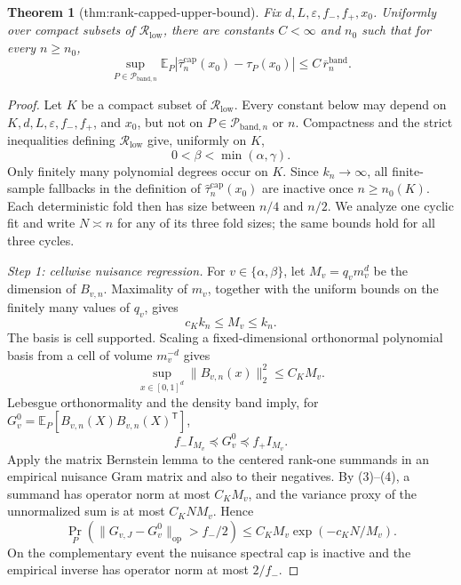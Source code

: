 \documentclass{article}
\newtheorem{theorem}{Theorem}
\begin{document}
\begin{theorem}[thm:rank-capped-upper-bound]\label{thm:rank-capped-upper-bound}
Fix \(d,L,\varepsilon,f_{-},f_{+},x_0\). Uniformly over compact subsets of \(\mathcal{R}_{\mathrm{low}}\), there are constants \(C<\infty\) and \(n_0\) such that for every \(n\ge n_0\), \[\sup_{P\in\mathcal{P}_{\mathrm{band},n}}\mathbb{E}_P\left|\widehat{\tau}^{\mathrm{cap}}_n(x_0)-\tau_P(x_0)\right|\le C\,\overline r_n^{\mathrm{band}}.\]
\end{theorem}
\begin{proof}
Let \(K\) be a compact subset of \(\mathcal R_{\mathrm{low}}\).  Every constant below may depend on \(K,d,L,\varepsilon,f_{-},f_{+}\), and \(x_0\), but not on \(P\in\mathcal P_{\mathrm{band},n}\) or \(n\).  Compactness and the strict inequalities defining \(\mathcal R_{\mathrm{low}}\) give, uniformly on \(K\),
\[
0<\beta<\min(\alpha,\gamma).
\tag{1}
\]
Only finitely many polynomial degrees occur on \(K\).  Since \(k_n\to\infty\), all finite-sample fallbacks in the definition of \(\widehat\tau_n^{\mathrm{cap}}(x_0)\) are inactive once \(n\ge n_0(K)\).  Each deterministic fold then has size between \(n/4\) and \(n/2\).  We analyze one cyclic fit and write \(N\asymp n\) for any of its three fold sizes; the same bounds hold for all three cycles.

\emph{Step 1: cellwise nuisance regression.}
For \(v\in\{\alpha,\beta\}\), let \(M_v=q_vm_v^d\) be the dimension of \(B_{v,n}\).  Maximality of \(m_v\), together with the uniform bounds on the finitely many values of \(q_v\), gives
\[
c_Kk_n\le M_v\le k_n.
\tag{2}
\]
The basis is cell supported.  Scaling a fixed-dimensional orthonormal polynomial basis from a cell of volume \(m_v^{-d}\) gives
\[
\sup_{x\in[0,1]^d}\lVert B_{v,n}(x)\rVert_2^2\le C_KM_v.
\tag{3}
\]
Lebesgue orthonormality and the density band imply, for
\(G_v^0=\mathbb E_P[B_{v,n}(X)B_{v,n}(X)^{\mathsf T}]\),
\[
f_-I_{M_v}\preceq G_v^0\preceq f_+I_{M_v}.
\tag{4}
\]
Apply the matrix Bernstein lemma to the centered rank-one summands in an empirical nuisance Gram matrix and also to their negatives.  By (3)--(4), a summand has operator norm at most \(C_KM_v\), and the variance proxy of the unnormalized sum is at most \(C_KNM_v\).  Hence
\[
\Pr_P\!\left(\lVert G_{v,J}-G_v^0\rVert_{\mathrm{op}}>f_-/2\right)
\le C_KM_v\exp(-c_KN/M_v).
\tag{5}
\]
On the complementary event the nuisance spectral cap is inactive and the empirical inverse has operator norm at most \(2/f_-\).


\end{proof}
\end{document}
